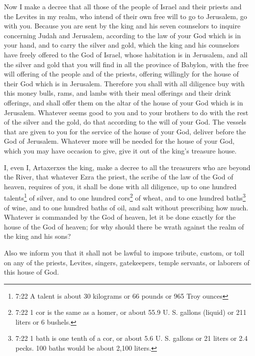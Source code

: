 Now
\myverse{}I make a decree that all those of the people of Israel and their priests and
the Levites in my realm, who intend of their own free will to go to Jerusalem, go with you.
\myverse{}Because you are sent by the king and his seven counselors to inquire concerning
Judah and Jerusalem, according to the law of your God which is in your hand,
\myverse{}and to carry the silver and gold, which the king and his counselors have freely
offered to the God of Israel, whose habitation is in Jerusalem,
\myverse{}and all the silver and gold that you will find in all the province of Babylon,
with the free will offering of the people and of the priests, offering willingly for the house of their
God which is in Jerusalem.
\myverse{}Therefore you shall with all diligence buy with this money bulls, rams, and
lambs with their meal offerings and their drink offerings, and shall offer them on the altar of the house
of your God which is in Jerusalem.
\myverse{}Whatever seems good to you and to your brothers to do with the rest of the
silver and the gold, do that according to the will of your God.
\myverse{}The vessels that are given to you for the service of the house of your God,
deliver before the God of Jerusalem.
\myverse{}Whatever more will be needed for the house of your God, which you may have
occasion to give, give it out of the king’s treasure house.

\myverse{}I, even I, Artaxerxes the king, make a decree to all
the treasurers who are beyond the River, that whatever Ezra the priest, the scribe of the law of the God
of heaven, requires of you, it shall be done with all diligence,
\myverse{}up to one hundred talents\footnote{7:22 A talent is about 30 kilograms or 66 pounds or 965 Troy ounces} of silver, and to one
hundred cors\footnote{7:22 1 cor is the same as a homer, or about 55.9 U. S. gallons (liquid) or 211 liters or 6 bushels.}
of wheat, and to one hundred baths\footnote{7:22 1 bath is one tenth of a cor, or about 5.6 U. S. gallons or 21 liters or 2.4 pecks. 100 baths
	would be about 2,100 liters.} of wine, and to one hundred baths of oil, and salt without prescribing
how much.
\myverse{}Whatever is commanded by the God of heaven, let it be done exactly for the
house of the God of heaven; for why should there be wrath against the realm of the king and his sons?

\myverse{}Also we inform you that it shall not be lawful to
impose tribute, custom, or toll on any of the priests, Levites, singers, gatekeepers, temple servants,
or laborers of this house of God.

